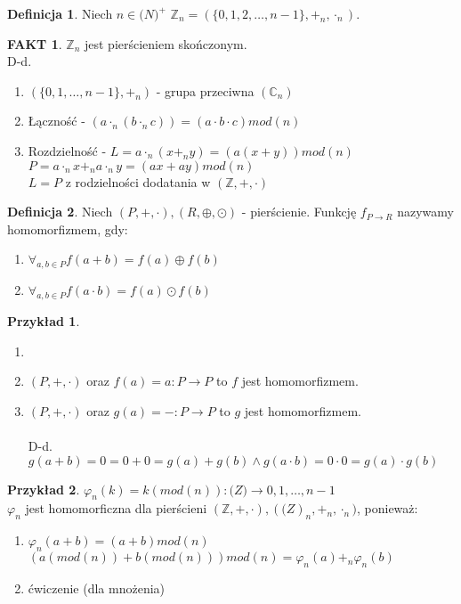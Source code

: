 \documentclass{article}
\theoremstyle{definition}
\newtheorem{de}{Definicja}[subsection]
\theoremstyle{definition}
\theoremstyle{definition}
\newtheorem{pk}{Przykład}[subsection]
\theoremstyle{definition}
\newtheorem*{fakt}{FAKT}
\begin{document}
\begin{de}
Niech $n\in \mathbb(N)^{+}$ $\mathbb{Z}_n=(\{0,1,2,\dots ,n-1\}, +_n, \cdot_n)$. 
\end{de}

\begin{fakt}
$\mathbb{Z}_n$ jest pierścieniem skończonym.\\
D-d.
\begin{enumerate}
\item $(\{0,1,\dots ,n-1\},+_n)$ - grupa przeciwna $(\mathbb{C}_n)$
\item Łączność - $(a\cdot_n(b\cdot_n c))=(a\cdot b\cdot c) mod (n)$
\item Rozdzielność - $L= a\cdot_n (x +_n y)=(a(x+y))mod (n)$\\
$P=a\cdot_n x +_n a \cdot_n y =(ax+ay)mod (n)$\\
$L=P$ z rodzielności dodatania w $(\mathbb{Z},+,\cdot)$
\end{enumerate}
\end{fakt}

\begin{de}
Niech $(P,+,\cdot), (R, \oplus, \odot)$ - pierścienie. Funkcję $f_{P\rightarrow R}$ nazywamy homomorfizmem, gdy:
\begin{enumerate}
\item $\forall_{a,b\in P} f(a+b)=f(a)\oplus f(b)$
\item $\forall_{a,b\in P} f(a\cdot b)=f(a)\odot f(b)$
\end{enumerate}
\end{de}

\begin{pk}
\begin{enumerate}
\item[]
\item $(P,+,\cdot)$ oraz $f(a)=a :P\rightarrow P$ to $f$ jest homomorfizmem.
\item $(P,+,\cdot)$ oraz $g(a)=- :P\rightarrow P$ to $g$ jest homomorfizmem.\\\\
D-d. $g(a+b)=0=0+0=g(a)+g(b) \land g(a\cdot b)=0\cdot 0 = g(a)\cdot g(b)$
\end{enumerate}
\end{pk}

\begin{pk}
$\varphi_n(k)=k (mod(n)) : \mathbb(Z) \rightarrow {0,1,\dots, n-1}$\\
$\varphi_n$ jest homomorficzna dla pierścieni $(\mathbb{Z},+,\cdot), (\mathbb(Z)_n,+_n,\cdot_n)$, ponieważ:
\begin{enumerate}
\item $\varphi_n (a+b)=(a+b) mod (n)$\\
$(a (mod (n)) + b (mod (n))) mod (n)=\varphi_n(a) +_n \varphi_n(b)$
\item ćwiczenie (dla mnożenia)
\end{enumerate}
\end{pk}
\end{document}
